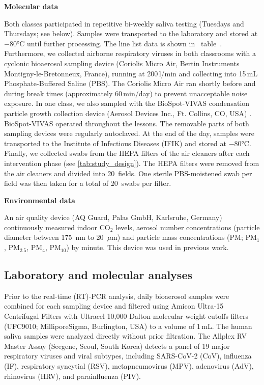 \documentclass[fleqn,11pt]{wlscirep}
\begin{document}
\noindent\textbf{Molecular data} \smallskip

\noindent Both classes participated in repetitive bi-weekly saliva testing (Tuesdays and Thursdays; see  below). Samples were transported to the laboratory and stored at $-$80°C until further processing\cite{Galar2021,To2019,Huber2021}. The line list data is shown in \supp~table~. Furthermore, we collected airborne respiratory viruses in both classrooms with a cyclonic bioaerosol sampling device (Coriolis Micro Air, Bertin Instruments Montigny-le-Bretonneux, France), running at 200\,l/min and collecting into 15\,mL Phosphate-Buffered Saline (PBS). The Coriolis Micro Air ran shortly before and during break times (approximately 60\,min/day) to prevent unacceptable noise exposure. In one class, we also sampled with the BioSpot-VIVAS condensation particle growth collection device (Aerosol Devices Inc., Ft. Collins, CO, USA) \cite{Pan2016JAM,Lednicky2016AST}. BioSpot-VIVAS operated throughout the lessons. The removable parts of both sampling devices were regularly autoclaved. At the end of the day, samples were transported to the Institute of Infectious Diseases (IFIK) and stored at $-$80°C. Finally, we collected swabs from the HEPA filters of the air cleaners after each intervention phase (see \cref{tab:study_design}). The HEPA filters were removed from the air cleaners and divided into 20~fields. One sterile PBS-moistened swab per field was then taken for a total of 20~swabs per filter. \medskip

\noindent\textbf{Environmental data} \smallskip

\noindent An air quality device (AQ Guard, Palas GmbH, Karlsruhe, Germany) continuously measured indoor CO$_2$ levels, aerosol number concentrations (particle diameter between 175~nm to 20~$\mu$m) and particle mass concentrations (PM; PM$_1$, PM$_{2.5}$, PM$_4$, PM$_{10}$) by minute. This device was used in previous work\cite{DiGilio2021,Duill2021,Banholzer2023PLoSMed}. 

\subsection{Laboratory and molecular analyses}\label{sec:mol_analyses}

\noindent Prior to the real-time (RT)-PCR analysis, daily bioaerosol samples were combined for each sampling device and filtered using Amicon Ultra-15 Centrifugal Filters with Ultracel 10,000 Dalton molecular weight cutoffs filters (UFC9010; MilliporeSigma, Burlington, USA) to a volume of 1\,mL. The human saliva samples were analyzed directly without prior filtration. The Allplex RV Master Assay (Seegene, Seoul, South Korea) detects a panel of 19 major respiratory viruses and viral subtypes, including SARS-CoV-2 (CoV), influenza (IF), respiratory syncytial (RSV), metapneumovirus (MPV), adenovirus (AdV), rhinovirus (HRV), and parainfluenza (PIV). 
\end{document}
